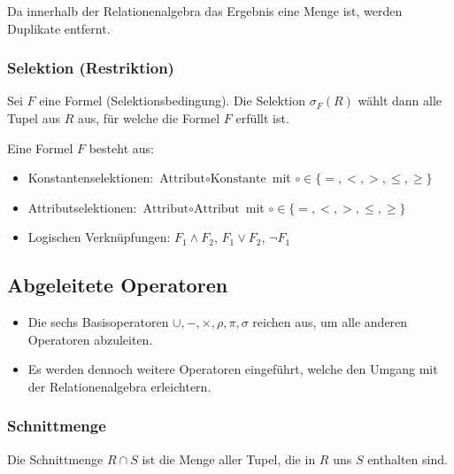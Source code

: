 \documentclass[a4paper, 11pt, accentcolor = tud3b]{tudreport}
\begin{document}
                    Da innerhalb der Relationenalgebra das Ergebnis eine Menge ist, werden Duplikate entfernt.

                \subsubsection{Selektion (Restriktion)} %
                    Sei \(F\) eine Formel (Selektionsbedingung). Die Selektion \(\sigma_F(R)\) wählt dann alle Tupel aus \(R\) aus, für welche die Formel \(F\) erfüllt ist.
                    
                    Eine Formel \(F\) besteht aus:
                    \begin{itemize}
                    	\item Konstantenselektionen:   \tabto{5cm} \( \text{Attribut} \circ \text{Konstante} \) mit \( \circ \in \{ =, <, >, \leq, \geq \} \)
                    	\item Attributselektionen:     \tabto{5cm} \( \text{Attribut} \circ \text{Attribut} \) mit \( \circ \in \{ =, <, >, \leq, \geq \} \)
                    	\item Logischen Verknüpfungen: \tabto{5cm} \( F_1 \land F_2 \), \( F_1 \lor F_2 \), \( \lnot F_1 \)
                    \end{itemize}

            \subsection{Abgeleitete Operatoren} %
                \begin{itemize}
                	\item Die sechs Basisoperatoren \( \cup, -, \times, \rho, \pi, \sigma \) reichen aus, um alle anderen Operatoren abzuleiten.
                	\item Es werden dennoch weitere Operatoren eingeführt, welche den Umgang mit der Relationenalgebra erleichtern.
                \end{itemize}

                \subsubsection{Schnittmenge} %
                    Die Schnittmenge \( R \cap S \) ist die Menge aller Tupel, die in \(R\) uns \(S\) enthalten sind.
                    
\end{document}

